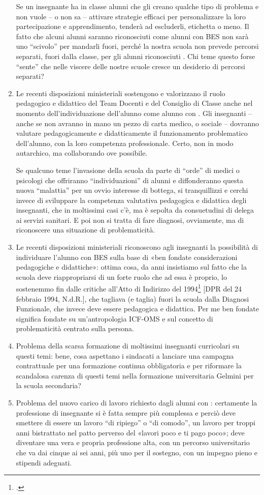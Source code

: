 \begin{enumerate}
	Se un insegnante ha in classe alunni che gli creano qualche tipo di problema e non vuole – o non sa – attivare strategie efficaci per personalizzare la loro partecipazione e apprendimento, tenderà ad escluderli, etichetta o meno. Il fatto che alcuni alunni saranno riconosciuti come alunni con BES non sarà uno “scivolo” per mandarli fuori, perché la nostra scuola non prevede percorsi separati, fuori dalla classe, per gli alunni riconosciuti . Chi teme questo forse “sente” che nelle viscere delle nostre scuole cresce un desiderio di percorsi separati?
	\item Le recenti disposizioni ministeriali sostengono e valorizzano il ruolo pedagogico e didattico del Team Docenti e del Consiglio di Classe anche nel momento dell'individuazione dell'alunno come alunno con . Gli insegnanti – anche se non avranno in mano un pezzo di carta medico, o sociale – dovranno valutare pedagogicamente e didatticamente il funzionamento problematico dell'alunno, con la loro competenza professionale. Certo, non in modo autarchico, ma collaborando ove possibile.
	
	Se qualcuno teme l'invasione della scuola da parte di “orde” di medici o psicologi che offriranno “individuazioni” di alunni   e diffonderanno questa nuova “malattia” per un ovvio interesse di bottega, si tranquillizzi e cerchi invece di sviluppare la competenza valutativa pedagogica e didattica degli insegnanti, che in moltissimi casi c'è, ma è sepolta da consuetudini di delega ai servizi sanitari. E poi non si tratta di fare diagnosi, ovviamente, ma di riconoscere una situazione di problematicità.
	\item  Le recenti disposizioni ministeriali riconoscono agli insegnanti la possibilità di individuare l'alunno con BES sulla base di «ben fondate considerazioni pedagogiche e didattiche»: ottima cosa, da anni insistiamo sul fatto che la scuola deve riappropriarsi di un forte ruolo che ad essa è proprio, lo sostenemmo fin dalle critiche all'Atto di Indirizzo del 1994\footcite{DPR1994} [DPR del 24 febbraio 1994, N.d.R.], che tagliava (e taglia) fuori la scuola dalla Diagnosi Funzionale, che invece deve essere pedagogica e didattica. Per me ben fondate significa fondate su un'antropologia ICF-OMS e sul concetto di problematicità centrato sulla persona.
	\item Problema della scarsa formazione di moltissimi insegnanti curricolari su questi temi: bene, cosa aspettano i sindacati a lanciare una campagna contrattuale per una formazione continua obbligatoria e per riformare la scandalosa carenza di questi temi nella formazione universitaria Gelmini per la scuola secondaria?
	\item Problema del nuovo carico di lavoro richiesto dagli alunni con : certamente la professione di insegnante si è fatta sempre più complessa e perciò deve smettere di essere un lavoro “di ripiego” o “di comodo”, un lavoro per troppi anni bistrattato nel patto perverso del «lavori poco e ti pago poco»; deve diventare una vera e propria professione alta, con un percorso universitario che va dai cinque ai sei anni, più uno per il sostegno, con un impegno pieno e stipendi adeguati.
	

\end{enumerate}

